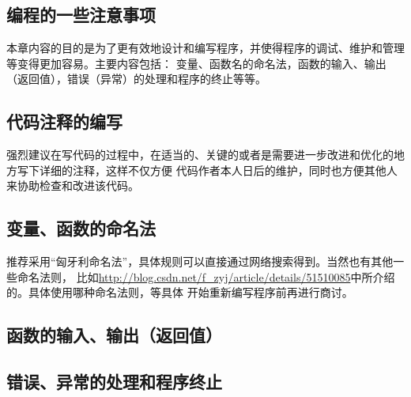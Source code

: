 \begin{appendix}
\chapter{编程的一些注意事项}
本章内容的目的是为了更有效地设计和编写程序，并使得程序的调试、维护和管理等变得更加容易。主要内容包括：
变量、函数名的命名法，函数的输入、输出（返回值），错误（异常）的处理和程序的终止等等。

\section{代码注释的编写}
强烈建议在写代码的过程中，在适当的、关键的或者是需要进一步改进和优化的地方写下详细的注释，这样不仅方便
代码作者本人日后的维护，同时也方便其他人来协助检查和改进该代码。

\section{变量、函数的命名法}
推荐采用“匈牙利命名法”，具体规则可以直接通过网络搜索得到。当然也有其他一些命名法则，
比如\url{http://blog.csdn.net/f_zyj/article/details/51510085}中所介绍的。具体使用哪种命名法则，等具体
开始重新编写程序前再进行商讨。

\section{函数的输入、输出（返回值）}


\section{错误、异常的处理和程序终止}


\end{appendix}
